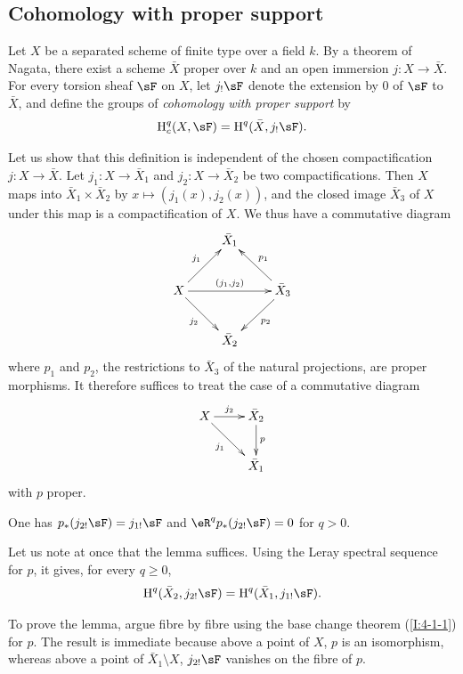 \subsection{Cohomology with proper support}\label{I:4-5}

\begin{definition}\label{I:4-5-1}
Let $X$ be a separated scheme of finite type over a field $k$. By a
theorem of Nagata, there exist a scheme $\bar X$ proper over $k$ and an
open immersion $j:X\to\bar X$. For every torsion sheaf $\sF$ on $X$,
let $j_!\sF$ denote the extension by $0$ of $\sF$ to $\bar X$, and
define the groups of \emph{cohomology with proper support} by
\[
  \h_c^q(X,\sF)=\h^q(\bar X, j_! \sF) \text{.}
\]
\end{definition}

Let us show that this definition is independent of the chosen
compactification $j:X\to\bar X$. Let $j_1:X\to\bar X_1$ and
$j_2:X\to\bar X_2$ be two compactifications. Then $X$ maps into
$\bar X_1\times\bar X_2$ by $x\mapsto(j_1(x),j_2(x))$, and
the closed image $\bar X_3$ of $X$ under this map is a compactification
of $X$. We thus have a commutative diagram
\[\xymatrix{
  & \bar X_1 \\
  X \ar[ur]^-{j_1} \ar[rr]^-{(j_1,j_2)} \ar[dr]_-{j_2}
    & & \bar X_3 \ar[ul]_-{p_1} \ar[dl]^-{p_2} \\
  & \bar X_2
}\]
where $p_1$ and $p_2$, the restrictions to $\bar X_3$ of the natural
projections, are proper morphisms. It therefore suffices to treat the case
of a commutative diagram
\[\xymatrix{
  X \ar[r]^-{j_2} \ar[dr]_-{j_1}
    & \bar X_2 \ar[d]^-p \\
  & \bar X_1
}\]
with $p$ proper.

\begin{lemma}\label{I:4-5-2}
One has $p_*(j_{2!}\sF)=j_{1!}\sF$ and
$\eR^qp_*(j_{2!}\sF)=0$ for $q>0$.
\end{lemma}

Let us note at once that the lemma suffices. Using the Leray spectral
sequence for $p$, it gives, for every $q\geqslant0$,
\[
  \h^q(\bar X_2, j_{2!} \sF) = \h^q(\bar X_1, j_{1!} \sF) \text{.}
\]

To prove the lemma, argue fibre by fibre using the base change theorem
(\ref{I:4-1-1}) for $p$. The result is immediate because above a point
of $X$, $p$ is an isomorphism, whereas above a point of
$\bar X_1\setminus X$, $j_{2!}\sF$ vanishes on the fibre of $p$.

\subsubsection{}\label{I:4-5-3}

